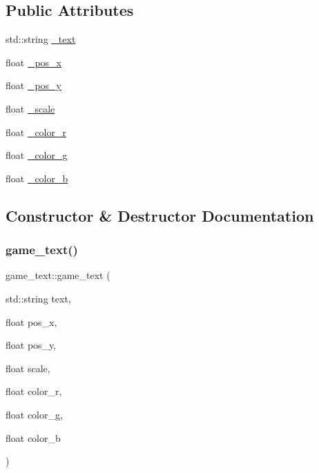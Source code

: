 \subsection*{Public Attributes}
\begin{DoxyCompactItemize}
\item 
std\+::string \hyperlink{classgame__text_ab809f6489478aa8027743e0a624f5de4}{\+\_\+text}
\item 
float \hyperlink{classgame__text_a5209d8b266c524c6f421367d7f6ae075}{\+\_\+pos\+\_\+x}
\item 
float \hyperlink{classgame__text_a5d712db3c22f15d88a6539e63f5135ff}{\+\_\+pos\+\_\+y}
\item 
float \hyperlink{classgame__text_a53ca360266e5df36e8fb809652c45e4c}{\+\_\+scale}
\item 
float \hyperlink{classgame__text_a24db298442718dcf0bfc34be2cadca34}{\+\_\+color\+\_\+r}
\item 
float \hyperlink{classgame__text_aed136aa415fa6edcccdac0f4854b7ae2}{\+\_\+color\+\_\+g}
\item 
float \hyperlink{classgame__text_a7615b072f422ba82917c23e446b065de}{\+\_\+color\+\_\+b}
\end{DoxyCompactItemize}


\subsection{Constructor \& Destructor Documentation}
\mbox{\label{classgame__text_aeda16b6fac60f1d021bc0ff545771c15}} 
\subsubsection{\texorpdfstring{game\+\_\+text()}{game\_text()}}
{\footnotesize\ttfamily game\+\_\+text\+::game\+\_\+text (\begin{DoxyParamCaption}\item[{std\+::string}]{text,  }\item[{float}]{pos\+\_\+x,  }\item[{float}]{pos\+\_\+y,  }\item[{float}]{scale,  }\item[{float}]{color\+\_\+r,  }\item[{float}]{color\+\_\+g,  }\item[{float}]{color\+\_\+b }\end{DoxyParamCaption})\hspace{0.3cm}{\ttfamily [inline]}}

